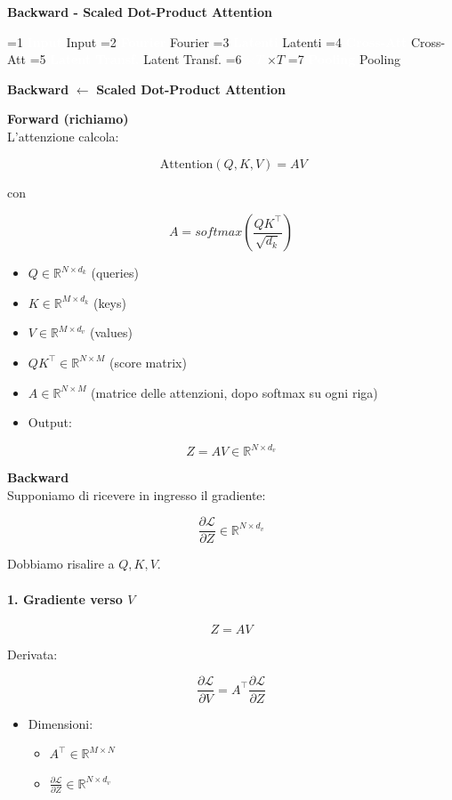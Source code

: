 \documentclass[
  11pt,
]{article}
\newcommand{\currentstep}[1]{%
\begin{tcolorbox}[colback=red!3, colframe=red!40!black, boxrule=0.3pt, arc=2pt,
  left=4pt, right=4pt, top=2pt, bottom=2pt]
{\footnotesize\textbf{Backward} $\longleftarrow$ \textbf{#1}}
\end{tcolorbox}}
\newcommand{\mystripchip}[3]{%
  \setlength{\fboxsep}{2.8pt}%
  \ifnum#3=#1\relax
    \colorbox{seccolor}{\textcolor{white}{\bfseries #2}}%
  \else
    \colorbox{seccolor!8}{\textcolor{seccolor!55}{#2}}%
  \fi}
\newcommand{\mystriparr}{{\fontsize{8}{8}\selectfont\;\textcolor{seccolor!45}{$\rightarrow$}\;}}
\newcommand{\mystrip}[1]{%
\begin{center}
{\sffamily\fontsize{7.5}{9}\selectfont
\mystripchip{1}{Input}{#1}\mystriparr\mystripchip{2}{Fourier}{#1}\mystriparr\mystripchip{3}{Latenti}{#1}\mystriparr%
\mystripchip{4}{Cross-Att}{#1}\mystriparr\mystripchip{5}{Latent Transf.}{#1}\mystriparr%
\mystripchip{6}{$\times T$}{#1}\mystriparr\mystripchip{7}{Pooling}{#1}}
\end{center}}
\renewcommand{\currentstep}[2][0]{%
\mystrip{#1}%
\begin{tcolorbox}[colback=red!3, colframe=red!40!black, boxrule=0.3pt, arc=2pt,
  left=4pt, right=4pt, top=2pt, bottom=2pt]
{\footnotesize\textbf{Backward} $\longleftarrow$ \textbf{#2}}
\end{tcolorbox}}
\begin{document}
\textbf{Backward - Scaled Dot-Product Attention}

\currentstep[5]{Scaled Dot-Product Attention}

\textbf{Forward (richiamo)}\\
L'attenzione calcola:

\[\text{ Attention}(Q,K,V) = AV\]

con

\[A = softmax\left( \frac{QK^{\top}}{\sqrt{d_{k}}} \right)\]

\begin{itemize}
\item
  \(Q \in \mathbb{R}^{N \times d_{k}}\) (queries)
\item
  \(K \in \mathbb{R}^{M \times d_{k}}\) (keys)
\item
  \(V \in \mathbb{R}^{M \times d_{v}}\) (values)
\item
  \(QK^{\top} \in \mathbb{R}^{N \times M}\) (score matrix)
\item
  \(A \in \mathbb{R}^{N \times M}\) (matrice delle attenzioni, dopo
  softmax su ogni riga)
\item
  Output:
\end{itemize}

\[Z = AV \in \mathbb{R}^{N \times d_{v}}\]

\textbf{Backward}\\
Supponiamo di ricevere in ingresso il gradiente:

\[\frac{\partial\mathcal{L}}{\partial Z} \in \mathbb{R}^{N \times d_{v}}\]

Dobbiamo risalire a \(Q,K,V\).

\paragraph{1. Gradiente verso $V$}

\[Z = AV\]

Derivata:


\[\frac{\partial\mathcal{L}}{\partial V} = A^{\top}\frac{\partial\mathcal{L}}{\partial Z}\]


\begin{itemize}
\item
  Dimensioni:

\begin{itemize}
  \item
    \(A^{\top} \in \mathbb{R}^{M \times N}\)
  \item
    \(\frac{\partial\mathcal{L}}{\partial Z} \in \mathbb{R}^{N \times d_{v}}\)
  \end{itemize}
\end{itemize}
\end{document}
